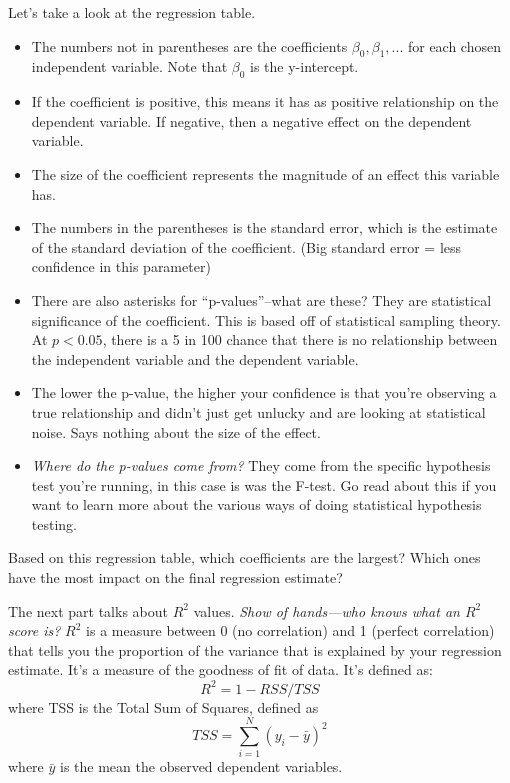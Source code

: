 \documentclass[11pt]{article}
\begin{document}
Let's take a look at the regression table. 
\begin{itemize}
    \item The numbers not in parentheses are the coefficients $\beta_0, \beta_1, ... $ for each chosen independent variable. Note that $\beta_0$ is the y-intercept.
    \item If the coefficient is positive, this means it has as positive relationship on the dependent variable. If negative, then a negative effect on the dependent variable.
    \item The size of the coefficient represents the magnitude of an effect this variable has. 
    \item The numbers in the parentheses is the standard error, which is the estimate of the standard deviation of the coefficient. (Big standard error = less confidence in this parameter)
    \item There are also asterisks for ``p-values''--what are these? They are statistical significance of the coefficient. This is based off of statistical sampling theory. At $p < 0.05$, there is a 5 in 100 chance that there is no relationship between the independent variable and the dependent variable.
    \item The lower the p-value, the higher your confidence is that you're observing a true relationship and didn't just get unlucky and are looking at statistical noise. Says nothing about the size of the effect. 
    \item {\it Where do the p-values come from?} They come from the specific hypothesis test you're running, in this case is was the F-test. Go read about this if you want to learn more about the various ways of doing statistical hypothesis testing. 
\end{itemize}

Based on this regression table, which coefficients are the largest? Which ones have the most impact on the final regression estimate?


The next part talks about $R^2$ values. {\it Show of hands---who knows what an $R^2$ score is?} $R^2$ is a measure between 0 (no correlation) and 1 (perfect correlation) that tells you the proportion of the variance that is explained by your regression estimate. It's a measure of the goodness of fit of data. It's defined as:
$$ R^2 = 1 - RSS / TSS$$ 
where TSS is the Total Sum of Squares, defined as 
$$ TSS = \sum_{i=1}^N (y_i - \bar{y})^2 $$ 
where $\bar{y}$ is the mean the observed dependent variables. 
\end{document}
